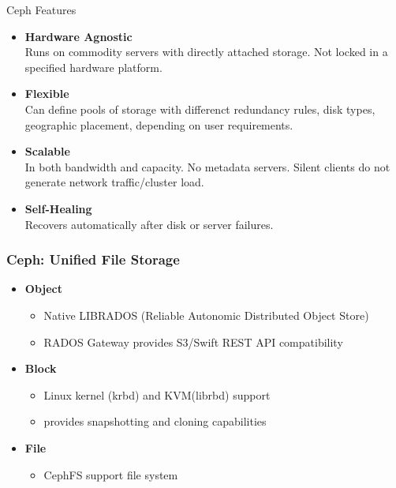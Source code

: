 \begin{frame}[t]{Ceph Features}
    \begin{itemize}
        \item \textbf{Hardware Agnostic} \\
            Runs on commodity servers with directly attached storage. Not locked in a specified hardware platform.
        \item \textbf{Flexible} \\
            Can define pools of storage with differenct redundancy rules, disk types, geographic placement, depending on user requirements.
        \item \textbf{Scalable} \\
            In both bandwidth and capacity. No metadata servers. Silent clients do not generate network traffic/cluster load.
        \item \textbf{Self-Healing} \\
            Recovers automatically after disk or server failures.
    \end{itemize}
\end{frame}

\begin{frame}
    \frametitle{Ceph: Unified File Storage}
    \begin{itemize}
        \item \textbf{Object}
            \begin{itemize}
                \item Native LIBRADOS (Reliable Autonomic Distributed Object Store)
                \item RADOS Gateway provides S3/Swift REST API compatibility
            \end{itemize}
        \item \textbf{Block}
            \begin{itemize}
                \item Linux kernel (krbd) and KVM(librbd) support
                \item provides snapshotting and cloning capabilities
            \end{itemize}
        \item \textbf{File}
            \begin{itemize}
                \item CephFS support file system
            \end{itemize}
    \end{itemize}
\end{frame}


